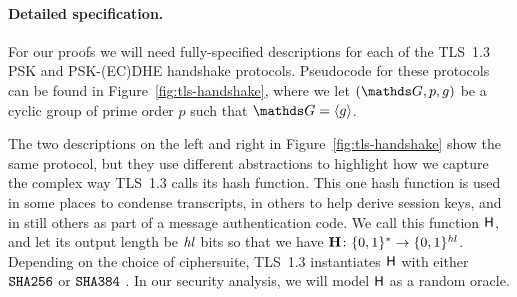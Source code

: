	



\paragraph{Detailed specification.}
For our proofs we will need fully-specified descriptions for each of the TLS~1.3 PSK and PSK-(EC)DHE handshake protocols. 
Pseudocode for these protocols can be found in Figure~\ref{fig:tls-handshake}, where we let $(\G, p, g)$ be a cyclic group of prime order $p$ such that $\G = \langle g \rangle$.

The two descriptions on the left and right in Figure~\ref{fig:tls-handshake} show the same protocol, but they use different abstractions to highlight how we capture the complex way TLS~1.3 calls its hash function.
This one hash function is used in some places to condense transcripts, in others to help derive session keys, and in still others as part of a message authentication code. 
We call this function $\mathsf{H}$, and let its output length be $\mathit{hl}$ bits so that we have $\mathbf{H} \colon \{0,1\}^* \to \{0,1\}^{\mathit{hl}}$. 
Depending on the choice of ciphersuite, TLS~1.3 instantiates $\mathsf{H}$ with either $\texttt{SHA{256}}$ or $\texttt{SHA{384}}$ \cite{NIST:FIPS-180-4}. In our security analysis, we will model $\mathsf{H}$ as a random oracle.

